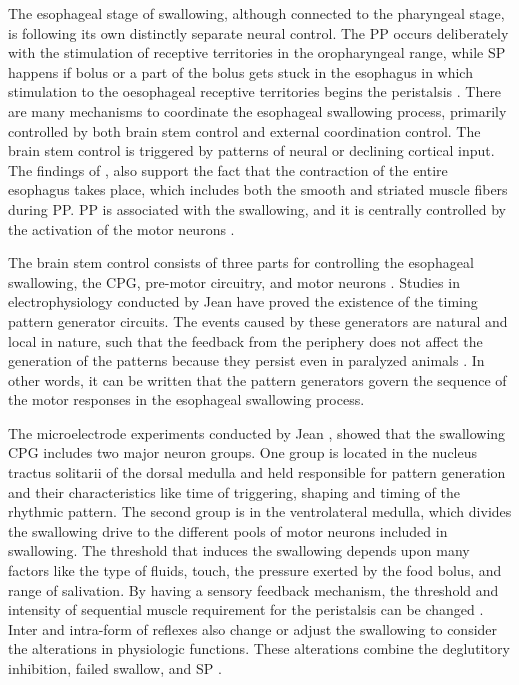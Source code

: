The esophageal stage of swallowing, although connected to the pharyngeal stage, is following its own distinctly separate neural control. The \ac{PP} occurs deliberately with the stimulation of receptive territories in the oropharyngeal range, while \ac{SP} happens if bolus or a part of the bolus gets stuck in the esophagus in which stimulation to the oesophageal receptive territories begins the peristalsis \cite{Miller1986,Miller1987}. There are many mechanisms to coordinate the esophageal swallowing process, primarily controlled by both brain stem control and external coordination control. The brain stem control is triggered by patterns of neural or declining cortical input. The findings of \cite{Miller1986,Miller1987}, also support the fact that the contraction of the entire esophagus takes place, which includes both the smooth and striated muscle fibers during \ac{PP}. \ac{PP} is associated with the swallowing, and it is centrally controlled by the activation of the motor neurons \cite{Miller1986,Miller1987}.

The brain stem control consists of three parts for controlling the esophageal swallowing, the \ac{CPG}, pre-motor circuitry, and motor neurons \cite{lang2009brain}. Studies in electrophysiology conducted by Jean \cite{Jean2001,jean1972localization} have proved the existence of the timing pattern generator circuits. The events caused by these generators are natural and local in nature, such that the feedback from the periphery does not affect the generation of the patterns because they persist even in paralyzed animals \cite{jean1972localization}. In other words, it can be written that the pattern generators govern the sequence of the motor responses in the esophageal swallowing process.

The microelectrode experiments conducted by Jean \cite{Jean2001}, showed that the swallowing \ac{CPG} includes two major neuron groups. One group is located in the nucleus tractus solitarii of the dorsal medulla and held responsible for pattern generation and their characteristics like time of triggering, shaping and timing of the rhythmic pattern. The second group is in the ventrolateral medulla, which divides the swallowing drive to the different pools of motor neurons included in swallowing.
The threshold that induces the swallowing depends upon many factors like the type of fluids, touch, the pressure exerted by the food bolus, and range of salivation. By having a sensory feedback mechanism, the threshold and intensity of sequential muscle requirement for the peristalsis can be changed \cite{Miller1987}. Inter and intra-form of reflexes also change or adjust the swallowing to consider the alterations in physiologic functions. These alterations combine the deglutitory inhibition, failed swallow, and \ac{SP} \cite{lang2009brain}.

